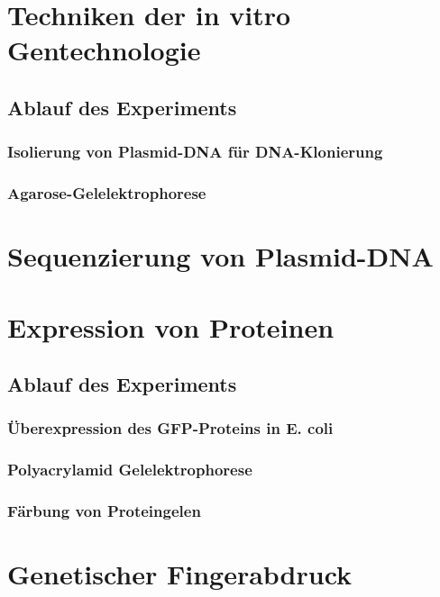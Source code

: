 \begin{mechanism}[title=Wie kann man eine Restriktionsschnittstelle kartieren ohne Sequenzierung und mit Hilfe anderer Restriktions Fragmentlängen?]
\todo
\end{mechanism}

\section{Techniken der in vitro Gentechnologie}
\todo
\subsection{Ablauf des Experiments}
\todo
\subsubsection{Isolierung von Plasmid-DNA für DNA-Klonierung}
\todo
\subsubsection{Agarose-Gelelektrophorese}
\todo

\section{Sequenzierung von Plasmid-DNA}
\todo

\section{Expression von Proteinen}
\todo

\subsection{Ablauf des Experiments}
\todo
\subsubsection{Überexpression des GFP-Proteins in E. coli}
\todo
\subsubsection{Polyacrylamid Gelelektrophorese} 
\todo
\subsubsection{Färbung von Proteingelen}
\todo

\section{Genetischer Fingerabdruck}
\todo

